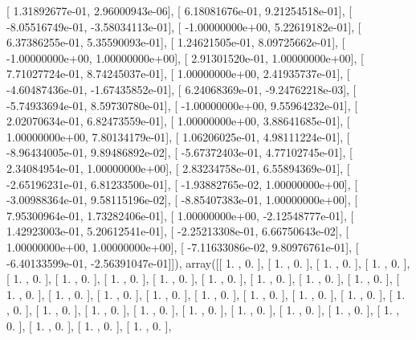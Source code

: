\documentclass{article}
\begin{document}
       [  1.31892677e-01,   2.96000943e-06],
       [  6.18081676e-01,   9.21254518e-01],
       [ -8.05516749e-01,  -3.58034113e-01],
       [ -1.00000000e+00,   5.22619182e-01],
       [  6.37386255e-01,   5.35590093e-01],
       [  1.24621505e-01,   8.09725662e-01],
       [ -1.00000000e+00,   1.00000000e+00],
       [  2.91301520e-01,   1.00000000e+00],
       [  7.71027724e-01,   8.74245037e-01],
       [  1.00000000e+00,   2.41935737e-01],
       [ -4.60487436e-01,  -1.67435852e-01],
       [  6.24068369e-01,  -9.24762218e-03],
       [ -5.74933694e-01,   8.59730780e-01],
       [ -1.00000000e+00,   9.55964232e-01],
       [  2.02070634e-01,   6.82473559e-01],
       [  1.00000000e+00,   3.88641685e-01],
       [  1.00000000e+00,   7.80134179e-01],
       [  1.06206025e-01,   4.98111224e-01],
       [ -8.96434005e-01,   9.89486892e-02],
       [ -5.67372403e-01,   4.77102745e-01],
       [  2.34084954e-01,   1.00000000e+00],
       [  2.83234758e-01,   6.55894369e-01],
       [ -2.65196231e-01,   6.81233500e-01],
       [ -1.93882765e-02,   1.00000000e+00],
       [ -3.00988364e-01,   9.58115196e-02],
       [ -8.85407383e-01,   1.00000000e+00],
       [  7.95300964e-01,   1.73282406e-01],
       [  1.00000000e+00,  -2.12548777e-01],
       [  1.42923003e-01,   5.20612541e-01],
       [ -2.25213308e-01,   6.66750643e-02],
       [  1.00000000e+00,   1.00000000e+00],
       [ -7.11633086e-02,   9.80976761e-01],
       [ -6.40133599e-01,  -2.56391047e-01]]), array([[ 1.        ,  0.        ],
       [ 1.        ,  0.        ],
       [ 1.        ,  0.        ],
       [ 1.        ,  0.        ],
       [ 1.        ,  0.        ],
       [ 1.        ,  0.        ],
       [ 1.        ,  0.        ],
       [ 1.        ,  0.        ],
       [ 1.        ,  0.        ],
       [ 1.        ,  0.        ],
       [ 1.        ,  0.        ],
       [ 1.        ,  0.        ],
       [ 1.        ,  0.        ],
       [ 1.        ,  0.        ],
       [ 1.        ,  0.        ],
       [ 1.        ,  0.        ],
       [ 1.        ,  0.        ],
       [ 1.        ,  0.        ],
       [ 1.        ,  0.        ],
       [ 1.        ,  0.        ],
       [ 1.        ,  0.        ],
       [ 1.        ,  0.        ],
       [ 1.        ,  0.        ],
       [ 1.        ,  0.        ],
       [ 1.        ,  0.        ],
       [ 1.        ,  0.        ],
       [ 1.        ,  0.        ],
       [ 1.        ,  0.        ],
       [ 1.        ,  0.        ],
       [ 1.        ,  0.        ],
       [ 1.        ,  0.        ],
       [ 1.        ,  0.        ],
\end{document}
